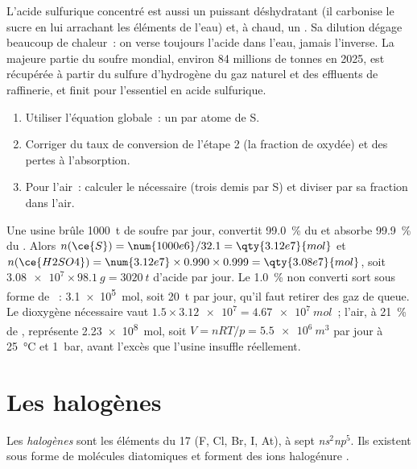 L'acide sulfurique concentré est aussi un puissant déshydratant (il
carbonise le sucre en lui arrachant les éléments de l'eau) et, à chaud,
un . Sa dilution dégage beaucoup de chaleur~: on verse toujours
l'acide dans l'eau, jamais l'inverse. La majeure partie du soufre
mondial, environ 84 millions de tonnes en 2025, est récupérée à partir
du sulfure d'hydrogène du gaz naturel et des effluents de raffinerie, et
finit pour l'essentiel en acide sulfurique.

\begin{method}\label{met:b1:p-block-16-18:contact-balance}
\begin{enumerate}
  \item Utiliser l'équation globale~: un  par atome de S.
  \item Corriger du taux de conversion de l'étape 2 (la fraction de
         oxydée) et des pertes à l'absorption.
  \item Pour l'air~: calculer le  nécessaire (trois demis par S)
        et diviser par sa fraction dans l'air.
\end{enumerate}
\end{method}

\begin{example}
Une usine brûle \qty{1000}{t} de soufre par jour, convertit
\qty{99.0}{\percent} du  et absorbe \qty{99.9}{\percent} du
. Alors
$n(\ce{S}) = \num{1000e6}/32.1 = \qty{3.12e7}{mol}$ et
$n(\ce{H2SO4}) = \num{3.12e7} \times 0.990 \times 0.999
= \qty{3.08e7}{mol}$, soit $\num{3.08e7} \times \qty{98.1}{g}
= \qty{3020}{t}$ d'acide par jour. Le \qty{1.0}{\percent} non converti
sort sous forme de ~: \qty{3.1e5}{mol}, soit \qty{20}{t} par
jour, qu'il faut retirer des gaz de queue. Le dioxygène nécessaire vaut
$1.5 \times \num{3.12e7} =
\qty{4.67e7}{mol}$~; l'air, à \qty{21}{\percent} de , représente
\qty{2.23e8}{mol}, soit $V = nRT/p = \qty{5.5e6}{m^3}$ par jour à
\qty{25}{\celsius} et \qty{1}{bar}, avant l'excès que l'usine insuffle
réellement.
\end{example}

\section{Les halogènes}

\begin{definition}[Halogènes]\label{def:b1:p-block-16-18:halogen}
Les \emph{halogènes} sont les éléments du
 17 (F, Cl,
Br, I, At), à sept  \textit{ns}$^2$\textit{np}$^5$.
Ils existent sous forme de molécules diatomiques  et forment des
ions halogénure .
\end{definition}

